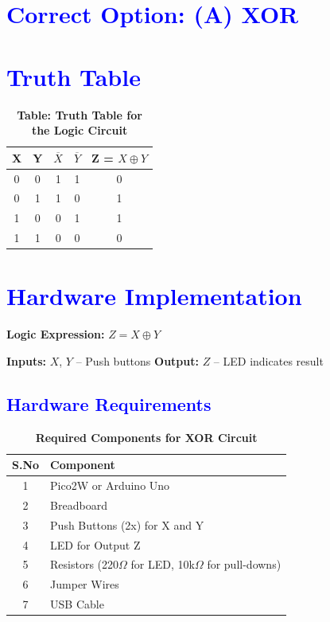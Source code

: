 \documentclass[twocolumn]{article}
\begin{document}
\section*{\textcolor{blue}{Correct Option: (A) XOR}}

\section*{\textcolor{blue}{Truth Table}}
\begin{table}[h]
\centering
\renewcommand{\arraystretch}{1.3}
\begin{tabular}{|c|c|c|c|c|}
\hline
X & Y & $\overline{X}$ & $\overline{Y}$ & Z = $X \oplus Y$ \\
\hline
0 & 0 & 1 & 1 & 0 \\
0 & 1 & 1 & 0 & 1 \\
1 & 0 & 0 & 1 & 1 \\
1 & 1 & 0 & 0 & 0 \\
\hline
\end{tabular}
\caption*{\textbf{Table: Truth Table for the Logic Circuit}}
\end{table}

\section*{\textcolor{blue}{Hardware Implementation}}

\textbf{Logic Expression:} $Z = X \oplus Y$

\textbf{Inputs:} $X$, $Y$ – Push buttons  
\textbf{Output:} $Z$ – LED indicates result

\subsection*{\textcolor{blue}{Hardware Requirements}}

\begin{table}[h]
\centering
\renewcommand{\arraystretch}{1.3}
\begin{tabular}{|c|l|}
\hline
\textbf{S.No} & \textbf{Component} \\ \hline
1 & Pico2W or Arduino Uno \\
2 & Breadboard \\
3 & Push Buttons (2x) for X and Y \\
4 & LED for Output Z \\
5 & Resistors (220$\Omega$ for LED, 10k$\Omega$ for pull-downs) \\
6 & Jumper Wires \\
7 & USB Cable \\
\hline
\end{tabular}
\caption*{\textbf{Required Components for XOR Circuit}}
\end{table}
\end{document}

